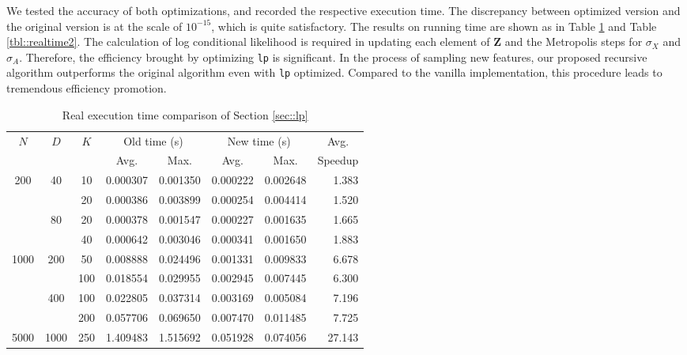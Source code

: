 \documentclass{article}
\begin{document}
We tested the accuracy of both optimizations, and recorded the respective execution time. The discrepancy between optimized version and the original version is at the scale of $10^{-15}$, which is quite satisfactory. The results on running time are shown as in Table \ref{tbl::realtime1} and Table \ref{tbl::realtime2}. The calculation of log conditional likelihood is required in updating each element of $\mathbf{Z}$ and the Metropolis steps for $\sigma_X$ and $\sigma_A$. Therefore, the efficiency brought by optimizing \texttt{lp} is significant. In the process of sampling new features, our proposed recursive algorithm outperforms the original algorithm even with \texttt{lp} optimized. Compared to the vanilla implementation, this procedure leads to tremendous efficiency promotion.

\begin{table}[!h]
  \centering
  \small
  \caption{Real execution time comparison of Section \ref{sec::lp}}
  \label{tbl::realtime1}
  \begin{tabular}{cccrrrrr}
    \toprule
      \multirow{2}{*}{$N$} & \multirow{2}{*}{$D$} & \multirow{2}{*}{$K$} & \multicolumn{2}{c}{Old time (s)} & \multicolumn{2}{c}{New time (s)} & \multicolumn{1}{c}{Avg.} \\ \cmidrule(lr){4-5} \cmidrule(lr){6-7}
      & & & \multicolumn{1}{c}{Avg.} & \multicolumn{1}{c}{Max.} & \multicolumn{1}{c}{Avg.} & \multicolumn{1}{c}{Max.} & \multicolumn{1}{c}{Speedup} \\
    \midrule
    \multirow{4}{*}{200} & \multirow{2}{*}{40} & 10 & 0.000307 & 0.001350 & 0.000222 & 0.002648 & 1.383
    \\
    & & 20 & 0.000386 & 0.003899 & 0.000254 & 0.004414 & 1.520
    \\
    & \multirow{2}{*}{80} & 20 & 0.000378 & 0.001547 & 0.000227 & 0.001635 & 1.665
    \\
    & & 40 & 0.000642 & 0.003046 & 0.000341 & 0.001650 & 1.883
    \\
    \multirow{4}{*}{1000} & \multirow{2}{*}{200} & 50 & 0.008888 & 0.024496 & 0.001331 & 0.009833 & 6.678
    \\
    & & 100 & 0.018554 & 0.029955 & 0.002945 & 0.007445 & 6.300
    \\
    & \multirow{2}{*}{400} & 100 & 0.022805 & 0.037314 & 0.003169 & 0.005084 & 7.196
    \\
    & & 200 & 0.057706 & 0.069650 & 0.007470 & 0.011485 & 7.725
    \\
    \multirow{4}{*}{5000} & \multirow{2}{*}{1000} & 250 & 1.409483 & 1.515692 & 0.051928 & 0.074056 & 27.143

\end{tabular}
\end{table}
\end{document}
